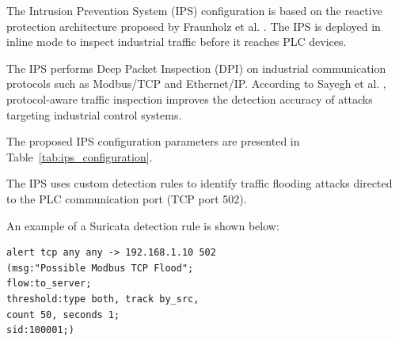 \documentclass[sigconf]{acmart}
\begin{document}
The Intrusion Prevention System (IPS) configuration is based on the reactive protection architecture proposed by Fraunholz et al. \cite{fraunholz2018industrial}. The IPS is deployed in inline mode to inspect industrial traffic before it reaches PLC devices.

The IPS performs Deep Packet Inspection (DPI) on industrial communication protocols such as Modbus/TCP and Ethernet/IP. According to Sayegh et al. \cite{sayegh2019ids}, protocol-aware traffic inspection improves the detection accuracy of attacks targeting industrial control systems.

The proposed IPS configuration parameters are presented in Table~\ref{tab:ips_configuration}.

\begin{table}[htbp]
\renewcommand{\tablename}{Table} 
\renewcommand{\thetable}{\arabic{table}}
\captionsetup{labelsep=period, labelfont=bf, textfont=normal, textformat=simple} 
\caption{IPS Configuration Parameters} 
\centering
\scriptsize
{}
\label{tab:ips_configuration}
\end{table}


The IPS uses custom detection rules to identify traffic flooding attacks directed to the PLC communication port (TCP port 502).

An example of a Suricata detection rule is shown below:

\begin{verbatim}
alert tcp any any -> 192.168.1.10 502
(msg:"Possible Modbus TCP Flood";
flow:to_server;
threshold:type both, track by_src,
count 50, seconds 1;
sid:100001;)
\end{verbatim}
\end{document}
